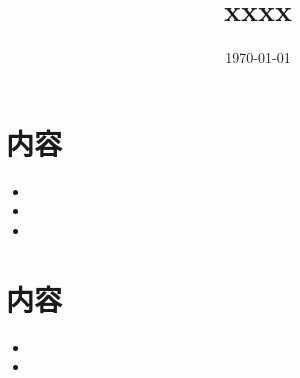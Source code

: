 \documentclass[a4paper,12pt]{ltjsarticle}
\title{xxxx}
\date{\today}
\begin{document}
\maketitle

\section*{内容}
\begin{itemize}[leftmargin=*,label={--}]
  \item 
  \item 
  \item 
\end{itemize}

\section*{内容}
\begin{itemize}[leftmargin=*,label={$\square$}]
  \item 
  \item 
\end{itemize}
\end{document}
